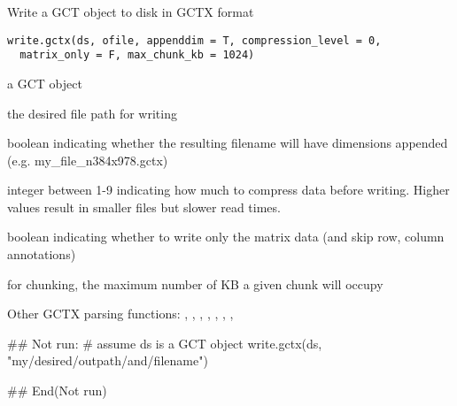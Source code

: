 \documentclass[letterpaper]{book}
\begin{document}
%
\begin{Description}\relax
Write a GCT object to disk in GCTX format
\end{Description}
%
\begin{Usage}
\begin{verbatim}
write.gctx(ds, ofile, appenddim = T, compression_level = 0,
  matrix_only = F, max_chunk_kb = 1024)
\end{verbatim}
\end{Usage}
%
\begin{Arguments}
\begin{ldescription}
\item[\code{ds}] a GCT object

\item[\code{ofile}] the desired file path for writing

\item[\code{appenddim}] boolean indicating whether the
resulting filename will have dimensions appended
(e.g. my\_file\_n384x978.gctx)

\item[\code{compression\_level}] integer between 1-9 indicating
how much to compress data before writing. Higher values
result in smaller files but slower read times.

\item[\code{matrix\_only}] boolean indicating whether to write
only the matrix data (and skip row, column annotations)

\item[\code{max\_chunk\_kb}] for chunking, the maximum number of KB
a given chunk will occupy
\end{ldescription}
\end{Arguments}
%
\begin{SeeAlso}\relax
Other GCTX parsing functions: ,
, ,
, ,
,
, 
\end{SeeAlso}
%
\begin{Examples}
\begin{ExampleCode}
## Not run: 
# assume ds is a GCT object
write.gctx(ds, "my/desired/outpath/and/filename")

## End(Not run)
\end{ExampleCode}
\end{Examples}
\end{document}
